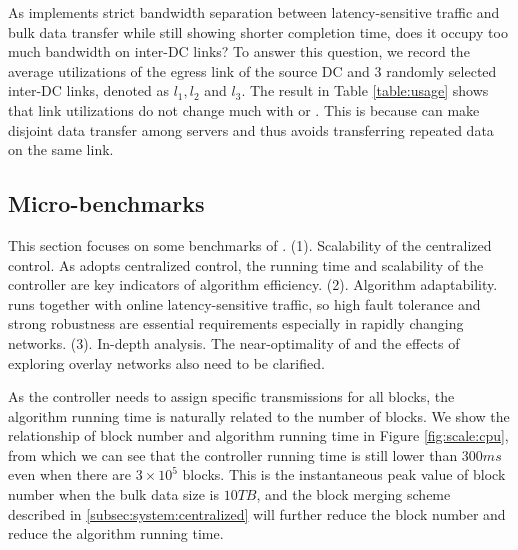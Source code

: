 As \name implements strict bandwidth separation between latency-sensitive traffic and bulk data transfer while still showing shorter completion time, does it occupy too much bandwidth on inter-DC links? To answer this question, we record the average utilizations of the egress link of the source DC and 3 randomly selected inter-DC links, denoted as $l_1,l_2$ and $l_3$. The result in Table \ref{table:usage} shows that link utilizations do not change much with \name or \company. This is because \name can make disjoint data transfer among servers and thus avoids transferring repeated data on the same link.


\subsection{Micro-benchmarks}
\label{subsec:evaluation:benchmarks}

This section focuses on some benchmarks of \name. (1). Scalability of the centralized control. As \name adopts centralized control, the running time and scalability of the controller are key indicators of algorithm efficiency. (2). Algorithm adaptability. \name runs together with online latency-sensitive traffic, so high fault tolerance and strong robustness are essential requirements especially in rapidly changing networks. (3). In-depth analysis. The near-optimality of \name and the effects of exploring overlay networks also need to be clarified.

\label{subsec:evaluation:benchmarks:scalability}

 As the controller needs to assign specific transmissions for all blocks, the algorithm running time is naturally related to the number of blocks. We show the relationship of block number and algorithm running time in Figure \ref{fig:scale:cpu}, from which we can see that the controller running time is still lower than $300ms$ even when there are $3\times 10^5$ blocks. This is the instantaneous peak value of block number when the bulk data size is $10TB$, and the block merging scheme described in \Section\ref{subsec:system:centralized} will further reduce the block number and reduce the algorithm running time.

